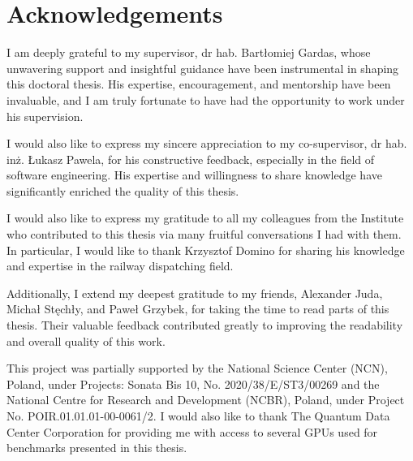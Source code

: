 \chapter{Acknowledgements}

I am deeply grateful to my supervisor, dr hab. Bartłomiej Gardas, whose unwavering support and insightful guidance have been instrumental in shaping this doctoral thesis. His expertise, encouragement, and mentorship have been invaluable, and I am truly fortunate to have had the opportunity to work under his supervision.

I would also like to express my sincere appreciation to my co-supervisor, dr hab. inż. Łukasz Pawela, for his constructive feedback, especially in the field of software engineering. His expertise and willingness to share knowledge have significantly enriched the quality of this thesis.

I would also like to express my gratitude to all my colleagues from the Institute who contributed to this thesis via many fruitful conversations I had with them. In particular, I would like to thank Krzysztof Domino for sharing his knowledge and expertise in the railway dispatching field.

Additionally, I extend my deepest gratitude to my friends, Alexander Juda, Michał Stęchły, and Paweł Grzybek, for taking the time to read parts of this thesis. Their valuable feedback contributed greatly to improving the readability and overall quality of this work.

This project was partially supported by the National Science Center (NCN), Poland, under Projects: Sonata Bis 10, No. 2020/38/E/ST3/00269
and the National Centre for Research and Development (NCBR), Poland, under Project No. POIR.01.01.01-00-0061/2. I would also like to thank The Quantum Data Center Corporation for providing me with access to several GPUs used for benchmarks presented in this thesis.

